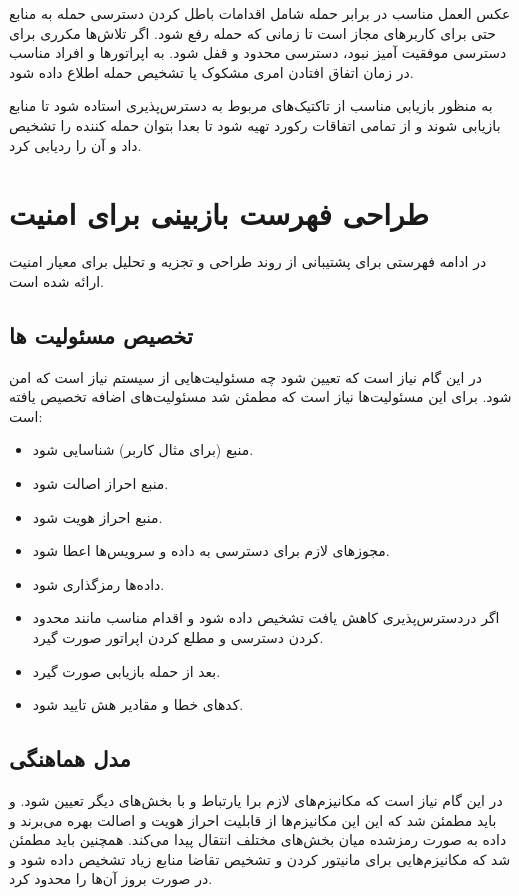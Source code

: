 عکس العمل مناسب در برابر حمله شامل اقدامات باطل کردن دسترسی حمله به منابع حتی برای کاربرهای مجاز است تا زمانی که حمله رفع شود. 
اگر تلاش‌ها مکرری برای دسترسی موفقیت آمیز نبود، دسترسی محدود و قفل شود. به اپراتورها و افراد مناسب در زمان اتفاق افتادن امری مشکوک یا تشخیص حمله اطلاع داده شود.

به منظور بازیابی مناسب از تاکتیک‌های مربوط به دسترس‌پذیری استاده شود تا  منابع بازیابی شوند و از تمامی اتفاقات رکورد تهیه شود تا بعدا بتوان حمله کننده را تشخیص داد و آن را ردیابی کرد.

\section{طراحی فهرست بازبینی برای امنیت}

در ادامه فهرستی برای پشتیبانی از روند طراحی و تجزیه و تحلیل برای معیار امنیت ارائه شده است.


\subsection{تخصیص مسئولیت ها} 
در این گام نیاز است که تعیین شود چه مسئولیت‌هایی از سیستم نیاز است که امن شود. برای این مسئولیت‌ها نیاز است که مطمئن شد مسئولیت‌های اضافه تخصیص یافته است:
\begin{itemize}
\item
منبع (برای مثال کاربر) شناسایی شود.
\item
منبع احراز اصالت شود.
\item
منبع احراز هویت شود.
\item
مجوز‌های لازم برای دسترسی به داده و سرویس‌ها اعطا شود.
\item
داده‌ها رمزگذاری شود.
\item 
اگر دردسترس‌پذیری کاهش یافت تشخیص داده شود و اقدام مناسب مانند محدود کردن دسترسی و مطلع کردن اپراتور صورت گیرد.
\item
بعد از حمله بازیابی صورت گیرد.
\item
کدهای خطا و مقادیر هش تایید شود.
\end{itemize}
\subsection{مدل هماهنگی}
در این گام نیاز است که مکانیزم‌های لازم برا یارتباط و با بخش‌های دیگر تعیین شود. و باید مطمئن شد که این این مکانیزم‌ها از قابلیت احراز هویت و اصالت بهره می‌برند و داده به صورت رمزشده میان بخش‌های مختلف انتقال پیدا می‌کند.
همچنین باید مطمئن شد که مکانیزم‌هایی برای مانیتور کردن و تشخیص تقاضا منابع زیاد تشخیص داده شود و در صورت بروز آن‌ها را محدود کرد.

